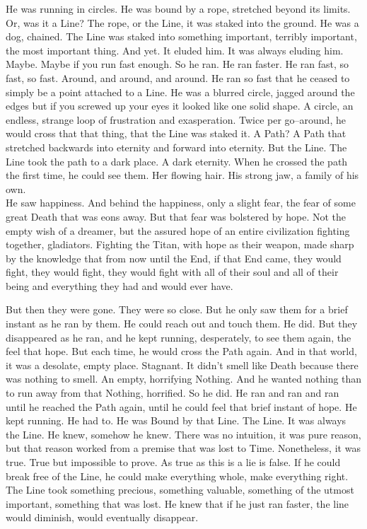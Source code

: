 He was running in circles. He was bound by a rope, stretched beyond its limits. Or, was it a Line? The rope, or the Line, it was staked into the ground. He was a dog, chained. The Line was staked into something important, terribly important, the most important thing. And yet. It eluded him. It was always eluding him.
\SmallVSpace
Maybe. Maybe if you run fast enough. So he ran. He ran faster. He ran fast, so fast, so fast. Around, and around, and around. He ran so fast that he ceased to simply be a point attached to a Line. He was a blurred circle, jagged around the edges but if you screwed up your eyes it looked like one solid shape. A circle, an endless, strange loop of frustration and exasperation. Twice per go\mbox{--}around, he would cross that{\el} that thing, that the Line was staked it. A Path? A Path that stretched backwards into eternity and forward into eternity. But the Line. The Line took the path to a dark place. A dark eternity.
\SmallVSpace
When he crossed the path the first time, he could see them. Her flowing hair. His strong jaw, a family of his own.\\He saw happiness. And behind the happiness, only a slight fear, the fear of some great Death that was eons away. But that fear was bolstered by hope. Not the empty wish of a dreamer, but the assured hope of an entire civilization fighting together, gladiators. Fighting the Titan, with hope as their weapon, made sharp by the knowledge that from now until the End, if that End came, they would fight, they would fight, they would fight with all of their soul and all of their being and everything they had and would ever have.

But then they were gone. They were so close. But he only saw them for a brief instant as he ran by them. He could reach out and touch them. He did. But they disappeared as he ran, and he kept running, desperately, to see them again, the feel that hope. But each time, he would cross the Path again. And in that world, it was a desolate, empty place. Stagnant. It didn’t smell like Death because there was nothing to smell. An empty, horrifying Nothing. And he wanted nothing than to run away from that Nothing, horrified.
\SmallVSpace
So he did.
\SmallVSpace
He ran and ran and ran until he reached the Path again, until he could feel that brief instant of hope. He kept running. He had to. He was Bound by that Line. The Line. It was always the Line. He knew, somehow he knew. There was no intuition, it was pure reason, but that reason worked from a premise that was lost to Time. Nonetheless, it was true. True but impossible to prove. As true as this is a lie is false. If he could break free of the Line, he could make everything whole, make everything right. The Line took something precious, something valuable, something of the utmost important, something that was lost. He knew that if he just ran faster, the line would diminish, would eventually disappear.

